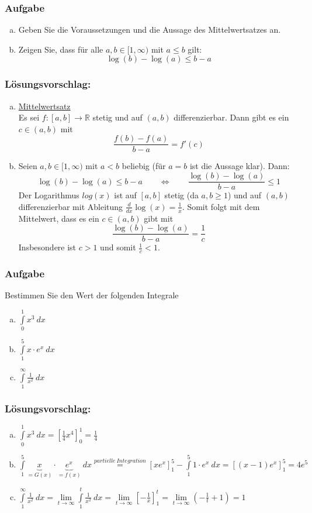 \documentclass[a4paper,11pt]{scrartcl}
\newcounter{auf}
\newcommand{\Aufgabe}%
        {\addtocounter{auf}{1} \subsubsection*{\rmfamily  Aufgabe \theauf \hspace{1em}} }
\newcommand{\RR}{\mathbb{R}}
\begin{document}
\newpage
\Aufgabe

\begin{enumerate}[a)]

\item Geben Sie die Voraussetzungen und die Aussage des Mittelwertsatzes an.
\item Zeigen Sie, dass für alle $a,b \in [1,\infty)$ mit $a\le b$ gilt:
$$
\log(b)-\log(a) \le b-a
$$
\end{enumerate}

\subsubsection*{Lösungsvorschlag:}
\begin{enumerate}[a)]
\item \underline{Mittelwertsatz}\\ Es sei $f:[a,b] \to \RR$ stetig und auf $(a,b)$ differenzierbar. Dann gibt es ein $c \in (a,b)$ mit
$$
\frac{f(b)-f(a)}{b-a}=f'(c)
$$
\item  Seien $a,b \in [1,\infty)$ mit $a< b$ beliebig (für $a=b$ ist die Aussage klar). Dann:
	$$
	\log(b)-\log(a) \le b-a \qquad \Longleftrightarrow \qquad \frac{\log(b)-\log(a)}{b-a} \le 1
	$$
	Der Logarithmus $log(x)$ ist auf $[a,b]$ stetig (da $a,b \ge 1$) und auf $(a,b)$ differenzierbar mit Ableitung $\frac{d}{dx}\log(x)=\frac{1}{x}$. Somit folgt mit dem Mittelwert, dass es ein $c\in (a,b)$ gibt mit 
		$$
		 \frac{\log(b)-\log(a)}{b-a} = \frac{1}{c}
	$$
Insbesondere ist $c>1$ und somit $ \frac{1}{c} < 1$.
\end{enumerate}

\newpage
\Aufgabe
Bestimmen Sie den Wert der folgenden Integrale
\begin{enumerate}[a)]
\item $\displaystyle\int \limits_{0}^1 x^3\ dx$
\item $\displaystyle\int \limits_{1}^5 x\cdot e^x \ dx$
\item $\displaystyle\int \limits_{1}^\infty \frac{1}{x^2}\ dx$
\end{enumerate}

\subsubsection*{Lösungsvorschlag:}

\begin{enumerate}[a)]
\item $\displaystyle\int \limits_{0}^1 x^3\ dx=\left[\frac{1}{4}x^4\right]_{0}^{1}=\frac{1}{4}$
\item $\displaystyle\int \limits_{1}^5 \underbrace{x}_{=G(x)}\cdot \underbrace{e^x}_{=f(x)} \ dx\stackrel{partielle \ Integration}{=} \left[xe^x\right]_1^5 - \displaystyle\int \limits_{1}^5 1\cdot e^x\ dx =[(x-1)e^x]_1^5=4e^5$
\item $\displaystyle\int \limits_{1}^\infty \frac{1}{x^2}\ dx = \lim \limits_{t \to \infty}\displaystyle\int \limits_{1}^t \frac{1}{x^2}\ dx = \lim \limits_{t \to \infty} \left[-\frac{1}{x}\right]_1^t= \lim \limits_{t \to \infty} \left(-\frac{1}{t}+1\right)=1$
\end{enumerate}
\end{document}
